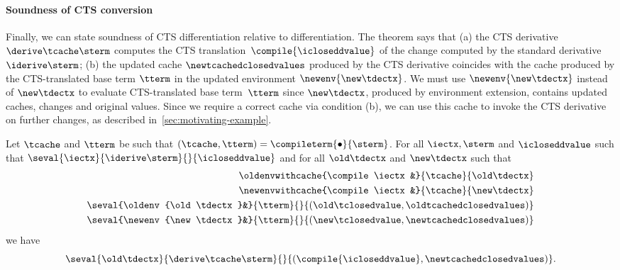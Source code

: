 \paragraph{Soundness of CTS conversion}
Finally, we can state soundness of CTS differentiation relative to differentiation.
The theorem says that (a) the CTS derivative $\derive\tcache\sterm$ computes the
CTS translation~$\compile{\icloseddvalue}$ of the
change computed by the standard derivative $\iderive\sterm$; (b) the updated
cache $\newtcachedclosedvalues$ produced by
the CTS derivative coincides with the cache produced by the CTS-translated base
term $\tterm$ in the updated environment $\newenv{\new\tdectx}$.
We must use $\newenv{\new\tdectx}$ instead of $\new\tdectx$ to evaluate
CTS-translated base term~$\tterm$ since $\new\tdectx$, produced by environment extension,
contains updated caches, changes and original values.
Since we require a correct cache via condition (b), we can use this cache
to invoke the CTS derivative on further changes, as described
in~\cref{sec:motivating-example}.

\begin{theorem}
  \label{thm:soundness-compiled-changesfinal}
  Let $\tcache$ and $\tterm$ be such that
  $(\tcache, \tterm) = \compileterm{\bullet}{\sterm}$.
  For all $\iectx, \sterm$ and $\icloseddvalue$ such that
  $\seval{\iectx}{\iderive\sterm}{}{\icloseddvalue}$ and
  for all $\old\tdectx$ and $\new\tdectx$ such that
  \begin{align*}
  \oldenvwithcache{\compile\iectx&}{\tcache}{\old\tdectx}\\
  \newenvwithcache{\compile\iectx&}{\tcache}{\new\tdectx}\\
  \seval{\oldenv{\old\tdectx}&}{\tterm}{}{(\old\tclosedvalue, \oldtcachedclosedvalues)}\\
  \seval{\newenv{\new\tdectx}&}{\tterm}{}{(\new\tclosedvalue, \newtcachedclosedvalues)}
  \end{align*}
  we have
  \[
  \seval{\old\tdectx}{\derive\tcache\sterm}{}{(\compile{\icloseddvalue}, \newtcachedclosedvalues)}
  .\]
\end{theorem}
